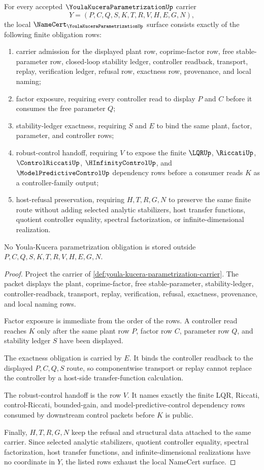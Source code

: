 \begin{theorem}
\label{thm:youla-kucera-parametrization-namecert-obligations}
For every accepted $\YoulaKuceraParametrizationUp$ carrier
$$
Y=(P,C,Q,S,K,T,R,V,H,E,G,N),
$$
the local $\NameCert_{\YoulaKuceraParametrizationUp}$ surface consists exactly of the following finite obligation rows:
\begin{enumerate}
\item carrier admission for the displayed plant row, coprime-factor row, free stable-parameter row, closed-loop stability ledger, controller readback, transport, replay, verification ledger, refusal row, exactness row, provenance, and local naming;
\item factor exposure, requiring every controller read to display $P$ and $C$ before it consumes the free parameter $Q$;
\item stability-ledger exactness, requiring $S$ and $E$ to bind the same plant, factor, parameter, and controller rows;
\item robust-control handoff, requiring $V$ to expose the finite $\LQRUp$, $\RiccatiUp$, $\ControlRiccatiUp$, $\HInfinityControlUp$, and $\ModelPredictiveControlUp$ dependency rows before a consumer reads $K$ as a controller-family output;
\item host-refusal preservation, requiring $H,T,R,G,N$ to preserve the same finite route without adding selected analytic stabilizers, host transfer functions, quotient controller equality, spectral factorization, or infinite-dimensional realization.
\end{enumerate}
No Youla-Kucera parametrization obligation is stored outside $P,C,Q,S,K,T,R,V,H,E,G,N$.
\end{theorem}
\begin{proof}
Project the carrier of \autoref{def:youla-kucera-parametrization-carrier}. The packet displays the plant, coprime-factor, free stable-parameter, stability-ledger, controller-readback, transport, replay, verification, refusal, exactness, provenance, and local naming rows.

Factor exposure is immediate from the order of the rows. A controller read reaches $K$ only after the same plant row $P$, factor row $C$, parameter row $Q$, and stability ledger $S$ have been displayed.

The exactness obligation is carried by $E$. It binds the controller readback to the displayed $P,C,Q,S$ route, so componentwise transport or replay cannot replace the controller by a host-side transfer-function calculation.

The robust-control handoff is the row $V$. It names exactly the finite LQR, Riccati, control-Riccati, bounded-gain, and model-predictive-control dependency rows consumed by downstream control packets before $K$ is public.

Finally, $H,T,R,G,N$ keep the refusal and structural data attached to the same carrier. Since selected analytic stabilizers, quotient controller equality, spectral factorization, host transfer functions, and infinite-dimensional realizations have no coordinate in $Y$, the listed rows exhaust the local NameCert surface.
\end{proof}

